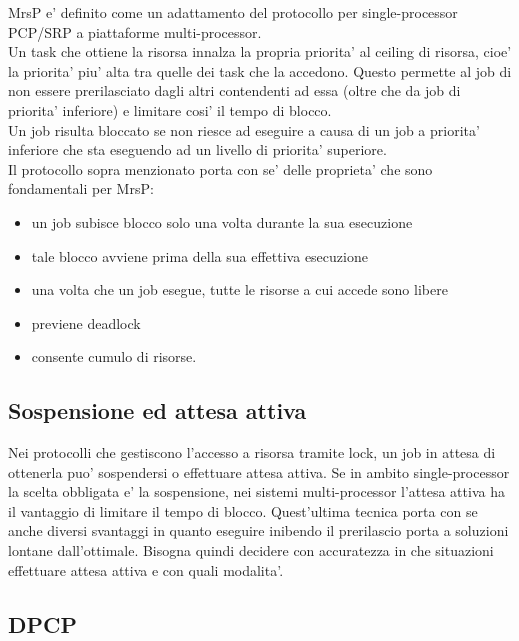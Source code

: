 \documentclass[a4paper,11pt]{article}
\begin{document}
\noindent MrsP e' definito come un adattamento del protocollo per single-processor PCP/SRP a piattaforme multi-processor.\\

\noindent Un task che ottiene la risorsa innalza la propria priorita' al ceiling di risorsa, cioe' la priorita' piu' alta tra quelle dei task che la accedono. Questo permette al job di non essere prerilasciato dagli altri contendenti ad essa (oltre che da job di priorita' inferiore) e limitare cosi' il tempo di blocco. \\

\noindent Un job risulta bloccato se non riesce ad eseguire a causa di un job a priorita' inferiore che sta eseguendo ad un livello di priorita' superiore.\\

\noindent Il protocollo sopra menzionato porta con se' delle proprieta' che sono fondamentali per MrsP:

\begin{itemize}
\item un job subisce blocco solo una volta durante la sua esecuzione
\item tale blocco avviene prima della sua effettiva esecuzione
\item una volta che un job esegue, tutte le risorse a cui accede sono libere
\item previene deadlock
\item consente cumulo di risorse.
\end{itemize}

\subsection{Sospensione ed attesa attiva}

\noindent Nei protocolli che gestiscono l'accesso a risorsa tramite lock, un job in attesa di ottenerla puo' sospendersi o effettuare attesa attiva. Se in ambito single-processor la scelta obbligata e' la sospensione, nei sistemi multi-processor l'attesa attiva ha il vantaggio di limitare il tempo di blocco. Quest'ultima tecnica porta con se anche diversi svantaggi in quanto eseguire inibendo il prerilascio porta a soluzioni lontane dall'ottimale. Bisogna quindi decidere con accuratezza in che situazioni effettuare attesa attiva e con quali modalita'.\\

\subsection{DPCP}
\end{document}
